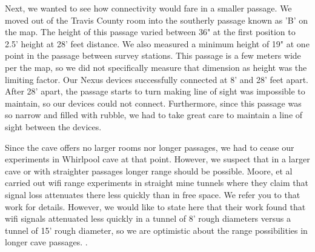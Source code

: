 \documentclass[10pt,twocolumn]{article}
\begin{document}
Next, we wanted to see how connectivity would fare in a smaller passage. 
We moved out of the Travis County room into the southerly passage known as 'B' on the map.
The height of this passage varied between 36" at the first position to 2.5' height at 28' feet distance.
We also measured a minimum height of 19" at one point in the passage between survey stations.
This passage is a few meters wide per the map, so we did not specifically measure that dimension as height was the limiting factor.
Our Nexus devices successfully connected at 8' and 28' feet apart.
After 28' apart, the passage starts to turn making line of sight was impossible to maintain, so our devices could not connect.
Furthermore, since this passage was so narrow and filled with rubble, we had to take great care to maintain a line of sight between the devices.

Since the cave offers no larger rooms nor longer passages, we had to cease our experiments in Whirlpool cave at that point.
However, we suspect that in a larger cave or with straighter passages longer range should be possible.
Moore, et al carried out wifi range experiments in straight mine tunnels where they claim that signal loss attenuates there less quickly than in free space.
We refer you to that work for details.
However, we would like to state here that their work found that wifi signals attenuated less quickly in a tunnel of 8' rough diameters versus a tunnel of 15' rough diameter, so we are optimistic about the range possibilities in longer cave passages. \cite{moore2012}.
\end{document}
